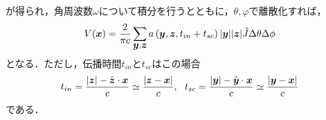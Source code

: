 が得られ，角周波数$\omega$について積分を行うとともに，$\theta,\varphi$で離散化すれば，
\begin{equation}
	V(\mbox{\boldmath $x$}) = 
	\frac{2}{\pi c} 
	\sum_{\mbox{\boldmath $y$},\mbox{\boldmath $z$}} 
	a\left(\mbox{\boldmath $y$}, \mbox{\boldmath $z$}, t_{in}+t_{sc} \right) 
	|\mbox{\boldmath $y$}| |\mbox{\boldmath $z$}|\hat{J} \Delta \theta \Delta \phi
	\label{eqn:ZZZ_38}
\end{equation}
となる．ただし，伝播時間$t_{in}$と$t_{sc}$はこの場合
\begin{equation}
	t_{in}=
	\frac{ |\mbox{\boldmath $z$}|-\hat{\mbox{\boldmath $z$}}\cdot \mbox{\boldmath $x$} }{c} \simeq 
	\frac{\left|\mbox{\boldmath $z$}-\mbox{\boldmath $x$}\right|}{c} 
	, \ \
	t_{sc}=
	\frac{ |\mbox{\boldmath $y$}|-\hat{\mbox{\boldmath $y$}}\cdot \mbox{\boldmath $x$} }{c} \simeq 
	\frac{\left|\mbox{\boldmath $y$}-\mbox{\boldmath $x$}\right|}{c} 
	\label{eqn:ZZZ_41}
\end{equation}
である．
